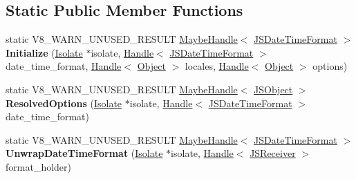 \subsection*{Static Public Member Functions}
\begin{DoxyCompactItemize}
\item 
\mbox{\label{classv8_1_1internal_1_1JSDateTimeFormat_a59ff208a9aef1e8b025f51d0caf4daec}} 
static V8\+\_\+\+W\+A\+R\+N\+\_\+\+U\+N\+U\+S\+E\+D\+\_\+\+R\+E\+S\+U\+LT \mbox{\hyperlink{classv8_1_1internal_1_1MaybeHandle}{Maybe\+Handle}}$<$ \mbox{\hyperlink{classv8_1_1internal_1_1JSDateTimeFormat}{J\+S\+Date\+Time\+Format}} $>$ {\bfseries Initialize} (\mbox{\hyperlink{classv8_1_1internal_1_1Isolate}{Isolate}} $\ast$isolate, \mbox{\hyperlink{classv8_1_1internal_1_1Handle}{Handle}}$<$ \mbox{\hyperlink{classv8_1_1internal_1_1JSDateTimeFormat}{J\+S\+Date\+Time\+Format}} $>$ date\+\_\+time\+\_\+format, \mbox{\hyperlink{classv8_1_1internal_1_1Handle}{Handle}}$<$ \mbox{\hyperlink{classv8_1_1internal_1_1Object}{Object}} $>$ locales, \mbox{\hyperlink{classv8_1_1internal_1_1Handle}{Handle}}$<$ \mbox{\hyperlink{classv8_1_1internal_1_1Object}{Object}} $>$ options)
\item 
\mbox{\label{classv8_1_1internal_1_1JSDateTimeFormat_a9d32ea3bf0fbd70d2210b3fc8eabc250}} 
static V8\+\_\+\+W\+A\+R\+N\+\_\+\+U\+N\+U\+S\+E\+D\+\_\+\+R\+E\+S\+U\+LT \mbox{\hyperlink{classv8_1_1internal_1_1MaybeHandle}{Maybe\+Handle}}$<$ \mbox{\hyperlink{classv8_1_1internal_1_1JSObject}{J\+S\+Object}} $>$ {\bfseries Resolved\+Options} (\mbox{\hyperlink{classv8_1_1internal_1_1Isolate}{Isolate}} $\ast$isolate, \mbox{\hyperlink{classv8_1_1internal_1_1Handle}{Handle}}$<$ \mbox{\hyperlink{classv8_1_1internal_1_1JSDateTimeFormat}{J\+S\+Date\+Time\+Format}} $>$ date\+\_\+time\+\_\+format)
\item 
\mbox{\label{classv8_1_1internal_1_1JSDateTimeFormat_a8b075c0f56e3c08f3b1ec52c6b48e0ce}} 
static V8\+\_\+\+W\+A\+R\+N\+\_\+\+U\+N\+U\+S\+E\+D\+\_\+\+R\+E\+S\+U\+LT \mbox{\hyperlink{classv8_1_1internal_1_1MaybeHandle}{Maybe\+Handle}}$<$ \mbox{\hyperlink{classv8_1_1internal_1_1JSDateTimeFormat}{J\+S\+Date\+Time\+Format}} $>$ {\bfseries Unwrap\+Date\+Time\+Format} (\mbox{\hyperlink{classv8_1_1internal_1_1Isolate}{Isolate}} $\ast$isolate, \mbox{\hyperlink{classv8_1_1internal_1_1Handle}{Handle}}$<$ \mbox{\hyperlink{classv8_1_1internal_1_1JSReceiver}{J\+S\+Receiver}} $>$ format\+\_\+holder)

\end{DoxyCompactItemize}
